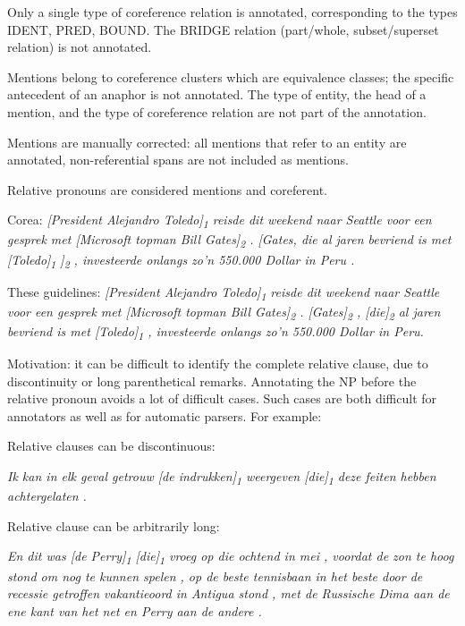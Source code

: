 \begin{itemize*}
\item Only a single type of coreference relation is annotated,
  corresponding to the types IDENT, PRED, BOUND. The BRIDGE relation
  (part/whole, subset/superset relation) is not annotated.
\item Mentions belong to coreference clusters which are equivalence
  classes; the specific antecedent of an anaphor is not annotated. The
  type of entity, the head of a mention, and the type of coreference
  relation are not part of the annotation.
\item Mentions are manually corrected: all mentions that refer to an entity
  are annotated, non-referential spans are not included as mentions.
\item Relative pronouns are considered mentions and coreferent.

  Corea: \emph{{[}President Alejandro Toledo{]}\textsubscript{1} reisde dit weekend naar
  Seattle voor een gesprek met {[}Microsoft topman Bill Gates{]}\textsubscript{2} .
  {[}Gates, die al jaren bevriend is met {[}Toledo{]}\textsubscript{1} {]}\textsubscript{2} ,
  investeerde onlangs zo'n 550.000 Dollar in Peru .}
  
  These guidelines: \emph{{[}President Alejandro Toledo{]}\textsubscript{1} reisde dit
  weekend naar Seattle voor een gesprek met {[}Microsoft topman Bill
  Gates{]}\textsubscript{2} . {[}Gates{]}\textsubscript{2} , {[}die{]}\textsubscript{2} al jaren bevriend is
  met {[}Toledo{]}\textsubscript{1} , investeerde onlangs zo'n 550.000 Dollar in
  Peru.}
  
  Motivation: it can be difficult to identify the complete relative
  clause, due to discontinuity or long parenthetical remarks. Annotating
  the NP before the relative pronoun avoids a lot of difficult cases.
  Such cases are both difficult for annotators as well as for automatic parsers.
  For example:

    \begin{itemize*}
    \item Relative clauses can be discontinuous:
    
      \emph{Ik kan in elk geval getrouw {[}de indrukken{]}\textsubscript{1} weergeven
      {[}die{]}\textsubscript{1} deze feiten hebben achtergelaten .}
      
    \item Relative clause can be arbitrarily long:
    
      \emph{En dit was {[}de Perry{]}\textsubscript{1} {[}die{]}\textsubscript{1} vroeg op die ochtend
      in mei , voordat de zon te hoog stond om nog te kunnen spelen , op de
      beste tennisbaan in het beste door de recessie getroffen vakantieoord
      in Antigua stond , met de Russische Dima aan de ene kant van het net
      en Perry aan de andere .}
      

\end{itemize*}
\end{itemize*}
